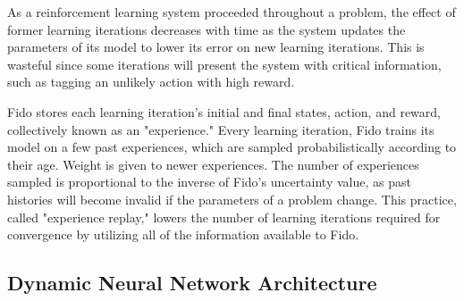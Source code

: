 As a reinforcement learning system proceeded throughout a problem, the effect of former learning iterations decreases with time as the system updates the parameters of its model to lower its error on new learning iterations. This is wasteful since some iterations will present the system with critical information, such as tagging an unlikely action with high reward.

Fido stores each learning iteration's initial and final states, action, and reward, collectively known as an "experience." Every learning iteration, Fido trains its model on a few past experiences, which are sampled probabilistically according to their age. Weight is given to newer experiences. The number of experiences sampled is proportional to the inverse of Fido's uncertainty value, as past histories will become invalid if the parameters of a problem change. This practice, called "experience replay," lowers the number of learning iterations required for convergence by utilizing all of the information available to Fido.

\subsection{Dynamic Neural Network Architecture}
